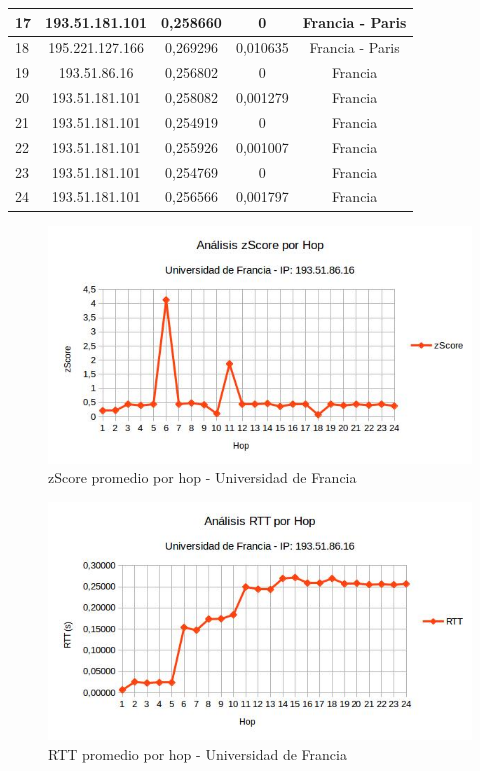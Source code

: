 \begin{tabular}{ | l | c | c | c | c |}
  \hline 
   17 & 193.51.181.101 & 0,258660 & 0 & Francia - Paris\\
  \hline 
   18 & 195.221.127.166 & 0,269296 & 0,010635 & Francia - Paris\\
  \hline 
   19 & 193.51.86.16 & 0,256802 & 0 & Francia\\
  \hline 
   20 & 193.51.181.101 & 0,258082 & 0,001279 & Francia\\
  \hline 
   21 & 193.51.181.101 & 0,254919 & 0 & Francia\\
  \hline 
   22 & 193.51.181.101 & 0,255926 & 0,001007 & Francia\\
  \hline 
   23 & 193.51.181.101 & 0,254769 & 0 & Francia\\
  \hline 
   24 & 193.51.181.101 & 0,256566 & 0,001797 & Francia\\
    
 \hline 
\end{tabular}

\bigskip

\begin{figure}[H]
\centering
\includegraphics[width=1\textwidth]{graficos/zScore_Francia.jpg}
\caption{zScore promedio por hop - Universidad de Francia}
\label{francia_zs}
\end{figure}

\begin{figure}[H]
\centering
\includegraphics[width=1\textwidth]{graficos/rTT_Francia.jpg}
\caption{RTT promedio por hop - Universidad de Francia}
\label{francia_rtt}
\end{figure}